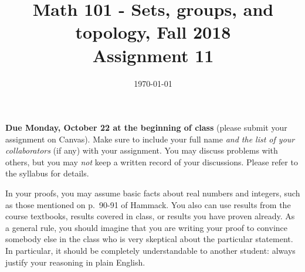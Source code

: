 \documentclass{amsart}
\title[Math 101, Fall 2018: assignment 11]{Math 101 - Sets, groups, and topology, Fall 2018 \\ Assignment 11}
\date{\today}
\theoremstyle{definition}
\begin{document}

\maketitle

\textbf{Due Monday, October 22 at the beginning of class} (please submit your assignment on Canvas). Make sure to include your full name \emph{and the list of your collaborators} (if any) with your assignment. You may discuss problems with others, but you may \emph{not} keep a written record of your discussions. Please refer to the syllabus for details.

In your proofs, you may assume basic facts about real numbers and integers, such as those mentioned on p.~90-91 of Hammack. You also can use results from the course textbooks, results covered in class, or results you have proven already. As a general rule, you should imagine that you are writing your proof to convince somebody else in the class who is very skeptical about the particular statement. In particular, it should be completely understandable to another student: always justify your reasoning in plain English. 
\end{document}

